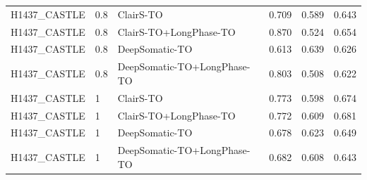 \documentclass[pdflatex,sn-nature]{sn-jnl}
\begin{document}
{\begin{longtable}{@{}lllccc@{}}
  H1437\_CASTLE & 0.8 & ClairS-TO & 0.709 & 0.589 & 0.643 \\
  H1437\_CASTLE & 0.8 & ClairS-TO+LongPhase-TO & 0.870 & 0.524 & 0.654 \\
  H1437\_CASTLE & 0.8 & DeepSomatic-TO & 0.613 & 0.639 & 0.626 \\
  H1437\_CASTLE & 0.8 & DeepSomatic-TO+LongPhase-TO & 0.803 & 0.508 & 0.622 \\
  H1437\_CASTLE & 1 & ClairS-TO & 0.773 & 0.598 & 0.674 \\
  H1437\_CASTLE & 1 & ClairS-TO+LongPhase-TO & 0.772 & 0.609 & 0.681 \\
  H1437\_CASTLE & 1 & DeepSomatic-TO & 0.678 & 0.623 & 0.649 \\
  H1437\_CASTLE & 1 & DeepSomatic-TO+LongPhase-TO & 0.682 & 0.608 & 0.643 \\
\end{longtable}
}
\end{document}
